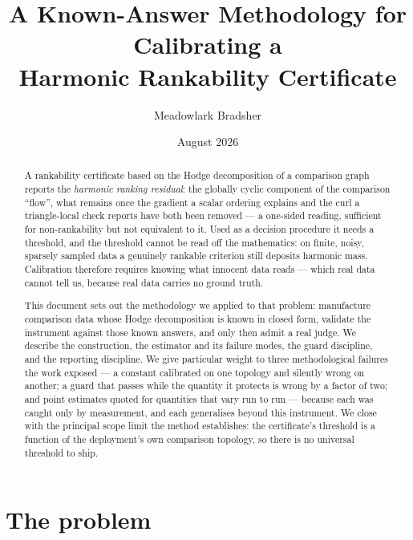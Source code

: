 \documentclass[11pt,a4paper]{article}
\title{\vspace{-1.5em}A Known-Answer Methodology for Calibrating a\\ Harmonic Rankability Certificate}
\author{Meadowlark Bradsher}
\date{August 2026}
\begin{document}
\maketitle

\begin{abstract}
\noindent
A rankability certificate based on the Hodge decomposition of a comparison graph
reports the \emph{harmonic ranking residual}: the globally cyclic component of
the comparison ``flow'', what remains once the gradient a scalar ordering explains
and the curl a triangle-local check reports have both been removed --- a
one-sided reading,
sufficient for non-rankability but not equivalent to it. Used as a decision procedure it needs a threshold, and the threshold
cannot be read off the mathematics: on finite, noisy, sparsely sampled data a
genuinely rankable criterion still deposits harmonic mass. Calibration therefore
requires knowing what innocent data reads --- which real data cannot tell us,
because real data carries no ground truth.

This document sets out the methodology we applied to that problem: manufacture
comparison data whose Hodge decomposition is known in closed form, validate the
instrument against those known answers, and only then admit a real judge. We
describe the construction, the estimator and its failure modes, the guard
discipline, and the reporting discipline. We give particular weight to three
methodological failures the work exposed --- a constant calibrated on one
topology and silently wrong on another; a guard that passes while the quantity it
protects is wrong by a factor of two; and point estimates quoted for quantities
that vary run to run --- because each was caught only by measurement, and each
generalises beyond this instrument. We close with the principal scope limit the
method establishes: the certificate's threshold is a function of the deployment's
own comparison topology, so there is no universal threshold to ship.
\end{abstract}

\section{The problem}\label{sec:problem}
\end{document}
